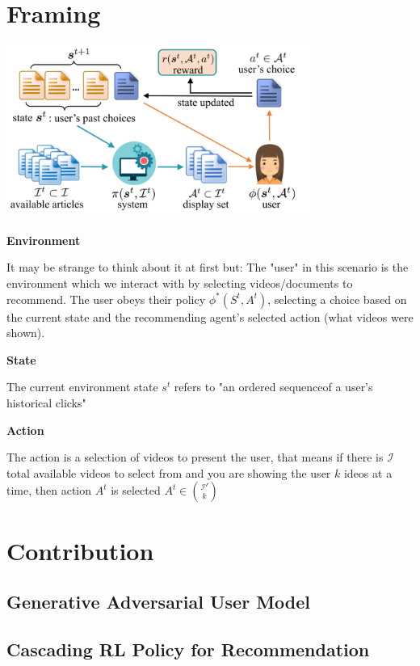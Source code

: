 \documentclass{article}
\begin{document}
    \section{Framing}
    \includegraphics[width=10cm]{fig1.png}
    
    \textbf{Environment}

    It may be strange to think about it at first but:
    The "user" in this scenario is the environment which we interact with by selecting videos/documents to recommend. The user obeys their policy $\phi ^* (S^t, A^t)$, selecting a choice based on the current state and the recommending agent's selected action (what videos were shown).

    \textbf{State}

    The current environment state $s^t$ refers to "an ordered sequenceof a user’s historical clicks"

    \textbf{Action}

    The action is a selection of videos to present the user, that means if there is $\mathcal{I}$ total available videos to select from and you are showing the user $k$ ideos at a time, then action $A^t$ is selected
    $A^t \in {\mathcal{I^t} \choose k}$

    \section{Contribution}

    \subsection{Generative Adversarial User Model}
    

    \subsection{Cascading RL Policy for Recommendation}
\end{document}
